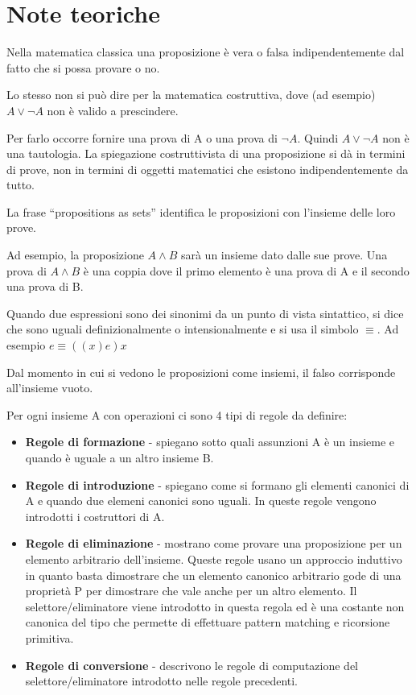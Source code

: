 \newpage
\appendix
\section{Note teoriche}

Nella matematica classica una proposizione è vera o falsa
indipendentemente dal fatto che si possa provare o no.

Lo stesso non si può dire per la matematica costruttiva, dove
(ad esempio) $A \lor \neg A$ non è valido a prescindere.

Per farlo occorre fornire una prova di A o una prova di $\neg A$.
Quindi $A \lor \neg A$ non è una tautologia.
La spiegazione costruttivista di una proposizione si dà in termini
di prove, non in termini di oggetti matematici che esistono
indipendentemente da tutto.

La frase ``propositions as sets'' identifica le proposizioni con
l'insieme delle loro prove.

Ad esempio, la proposizione $A \land B$ sarà un insieme dato
dalle sue prove. Una prova di $A \land B$ è una coppia dove il
primo elemento è una prova di A e il secondo una prova di B.

Quando due espressioni sono dei sinonimi da un punto di vista sintattico,
si dice che sono uguali definizionalmente o intensionalmente e si usa
il simbolo $\equiv$.
Ad esempio $e \equiv ((x)e)x$

Dal momento in cui si vedono le proposizioni come insiemi, il falso
corrisponde all'insieme vuoto.

Per ogni insieme A con operazioni ci sono 4 tipi di regole da definire:

\begin{itemize}
\item \textbf{Regole di formazione} - spiegano sotto quali assunzioni
A è un insieme e quando è uguale a un altro insieme B.
\item \textbf{Regole di introduzione} - spiegano come si formano gli
elementi canonici di A e quando due elemeni canonici sono uguali.
In queste regole vengono introdotti i costruttori di A.
\item \textbf{Regole di eliminazione} - mostrano come provare una
proposizione per un elemento arbitrario dell'insieme. Queste regole
usano un approccio induttivo in quanto basta dimostrare che un
elemento canonico arbitrario gode di una proprietà P per
dimostrare che vale anche per un altro elemento.
Il selettore/eliminatore viene introdotto in questa regola ed è una
costante non canonica del tipo che permette di effettuare pattern
matching e ricorsione primitiva.
\item \textbf{Regole di conversione} - descrivono le regole di
computazione del selettore/eliminatore introdotto nelle regole precedenti.
\end{itemize}
